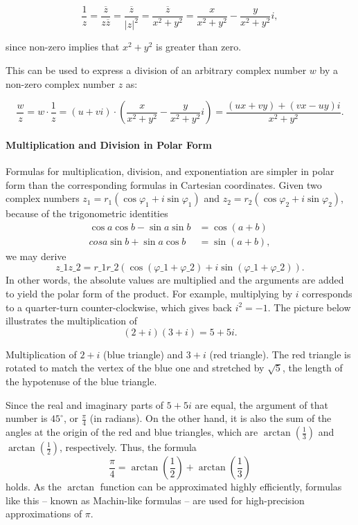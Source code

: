$$\frac{1}{z} = \frac{\overline{z}}{z \overline{z}} = \frac{\overline{z}}{|z|^2} = \frac{\overline{z}}{x^2 + y^2} = \frac{x}{x^2 + y^2} - \frac{y}{x^2 + y^2}i,$$

since non-zero implies that $x^2 + y^2$ is greater than zero.

This can be used to express a division of an arbitrary complex number $w$ by a non-zero complex number $z$ as:

$$\frac{w}{z} = w \cdot \frac{1}{z} = (u + vi) \cdot \left(\frac{x}{x^2 + y^2} - \frac{y}{x^2 + y^2}i\right) = \frac{(ux + vy) + (vx - uy)i}{x^2 + y^2}.$$

\paragraph{Multiplication and Division in Polar Form}

Formulas for multiplication, division, and exponentiation are simpler in polar form than the corresponding formulas in Cartesian coordinates. Given two complex numbers $z_1 = r_1(\cos \varphi_1 + i \sin \varphi_1)$ and $z_2 = r_2(\cos \varphi_2 + i \sin \varphi_2)$, because of the trigonometric identities
\begin{align}
\cos a \cos b - \sin a \sin b &= \cos(a + b) \\cos a \sin b + \sin a \cos b &= \sin(a + b),
\end{align}
we may derive
$$
z\_1 z\_2 = r\_1 r\_2 (\cos (\varphi\_1 + \varphi\_2) + i \sin (\varphi\_1 + \varphi\_2)).
$$
In other words, the absolute values are multiplied and the arguments are added to yield the polar form of the product. For example, multiplying by $i$ corresponds to a quarter-turn counter-clockwise, which gives back $i^2 = -1$. The picture below illustrates the multiplication of
$$
(2 + i)(3 + i) = 5 + 5i.
$$

Multiplication of $2 + i$ (blue triangle) and $3 + i$ (red triangle). The red triangle is rotated to match the vertex of the blue one and stretched by $\sqrt{5}$, the length of the hypotenuse of the blue triangle.

Since the real and imaginary parts of $5 + 5i$ are equal, the argument of that number is $45^\circ$, or $\frac{\pi}{4}$ (in radians). On the other hand, it is also the sum of the angles at the origin of the red and blue triangles, which are $\arctan\left(\frac{1}{3}\right)$ and $\arctan\left(\frac{1}{2}\right)$, respectively. Thus, the formula
$$
\frac{\pi}{4} = \arctan \left(\frac{1}{2}\right) + \arctan \left(\frac{1}{3}\right)
$$
holds. As the $\arctan$ function can be approximated highly efficiently, formulas like this – known as Machin-like formulas – are used for high-precision approximations of $\pi$.

